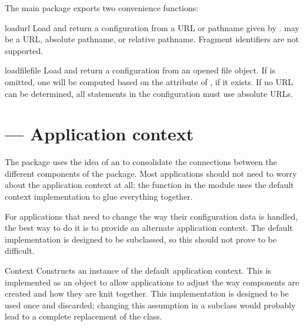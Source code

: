 \documentclass{howto}
\begin{document}

The main  package exports two convenience functions:

\begin{funcdesc}{load}{url}
  Load and return a configuration from a URL or pathname given by
  .   may be a URL, absolute pathname, or relative
  pathname.  Fragment identifiers are not supported.
\end{funcdesc}

\begin{funcdesc}{loadfile}{file}
  Load and return a configuration from an opened file object.
  If  is omitted, one will be computed based on the
   attribute of , if it exists.  If no URL can
  be determined, all  statements in the configuration
  must use absolute URLs.
\end{funcdesc}


\section{ --- Application context}


The  package uses the idea of an  to consolidate the connections between the different
components of the package.  Most applications should not need to worry
about the application context at all; the  function
in the  module uses the default context implementation
to glue everything together.

For applications that need to change the way their configuration data
is handled, the best way to do it is to provide an alternate
application context.  The default implementation is designed to be
subclassed, so this should not prove to be difficult.

\begin{classdesc}{Context}{}
  Constructs an instance of the default application context.  This is
  implemented as an object to allow applications to adjust the way
  components are created and how they are knit together.  This
  implementation is designed to be used once and discarded; changing
  this assumption in a subclass would probably lead to a complete
  replacement of the class.
\end{classdesc}
\end{document}
